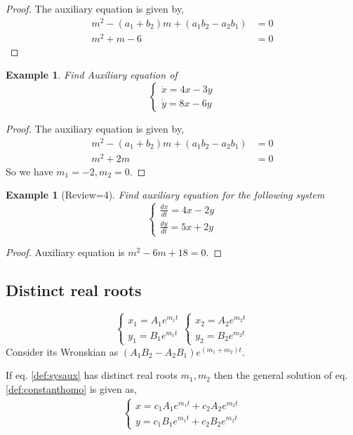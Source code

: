 \documentclass[oneside,11pt,pdftex,final]{book}%
\numberwithin{equation}{section}
\newtheorem{example}[theorem]{Example}
\numberwithin{section}{chapter}
\numberwithin{equation}{chapter}
\begin{document}
\begin{proof}
	The auxiliary equation is given by,
	\begin{align*}
		m^2-(a_1+b_2)m+(a_1b_2-a_2b_1)&=0\\
		m^2+m-6&=0
	\end{align*}
\end{proof}
\begin{example}
	Find Auxiliary equation of 
	\[ \begin{cases}
		\dot{x}=4x-3y\\
		\dot{y}=8x-6y
	\end{cases} \]
\end{example}
\begin{proof}
	The auxiliary equation is given by,
	\begin{align*}
		m^2-(a_1+b_2)m+(a_1b_2-a_2b_1)&=0\\
		m^2+2m&=0
	\end{align*}
	So we have $ m_1=-2,m_2=0 $.
\end{proof}

\begin{example}[Review=4]
	Find auxiliary equation for the following system
	\[ \begin{cases}
		\frac{dx}{dt}=4x-2y\\
		\frac{dy}{dt}=5x+2y
	\end{cases} \]
\end{example}
\begin{proof}
	Auxiliary equation is $ m^2-6m+18=0 $.
\end{proof}

\subsection{Distinct real roots}
\[ \begin{cases}
	x_1=A_1e^{m_1t}\\
	y_1=B_1e^{m_1t}
\end{cases} \begin{cases}
	x_2=A_2e^{m_2t}\\
	y_2=B_2e^{m_2t}
\end{cases}
\]
Consider its Wronskian as $ (A_1B_2-A_2B_1)e^{(m_1+m_2)t} $.


If eq. \ref{def:sysaux} has distinct real roots $ m_1, m_2 $ then the general solution of eq. \ref{def:constanthomo} is given as,
\begin{align*}
	\begin{cases}
		x=c_1A_1e^{m_1t}+c_2A_2e^{m_2t}\\
		y=c_1B_1e^{m_1t}+c_2B_2e^{m_2t}
	\end{cases}
\end{align*}
\end{document}
